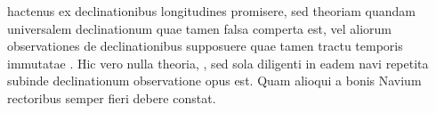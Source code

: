 hactenus ex declinationibus\protect{} longitudines\protect{} promisere, sed  theoriam quandam universalem declinationum\protect{}  quae tamen falsa comperta est, vel aliorum observationes  de declinationibus\protect{} supposuere quae tamen tractu temporis  immutatae . Hic vero nulla theoria, , sed sola diligenti in eadem navi\protect{} repetita subinde declinationum observatione opus est. Quam alioqui a bonis Navium\protect{} rectoribus semper fieri debere constat.\pend
